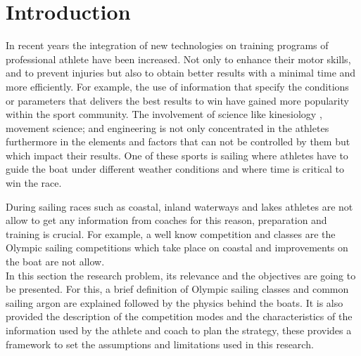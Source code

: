 \chapter{Introduction}


In recent years the integration of new technologies on training programs of professional athlete have been increased. Not only to enhance their motor skills, and to prevent injuries but also to obtain better results with a minimal time and more efficiently. For example, the use of information that specify the conditions or parameters that delivers the best results to win have gained more popularity within the sport community. The involvement of science like kinesiology \cite{sjogaard2015science}, movement science; and engineering is not only concentrated in the athletes furthermore in the elements and factors that can not be controlled by them but which impact their results. One of these sports is sailing where athletes have to guide the boat under different weather conditions and where time is critical to win the race.\newline

During sailing races such as coastal, inland waterways and lakes athletes are not allow to get any information from coaches for this reason, preparation and training is crucial. For example, a well know competition and classes are the Olympic sailing competitions which take place on coastal and improvements on the boat are not allow. \\

In this section the research problem, its relevance and the objectives are going to be presented. For this, a brief definition of Olympic sailing classes and common sailing argon are explained followed by the physics behind the boats. It is also provided the description of the competition modes and the characteristics of the information used by the athlete and coach to plan the strategy, these provides a framework to set the assumptions and limitations used in this research.
\\

